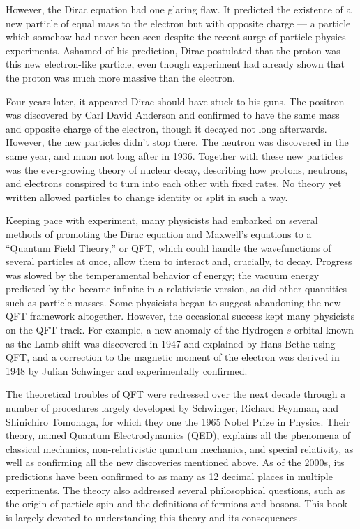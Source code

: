 However, the Dirac equation had one glaring flaw. It predicted the existence of a new particle of equal mass to the electron but with opposite charge --- a particle which somehow had never been seen despite the recent surge of particle physics experiments. Ashamed of his prediction, Dirac postulated that the proton was this new electron-like particle, even though experiment had already shown that the proton was much more massive than the electron.

Four years later, it appeared Dirac should have stuck to his guns. The positron was discovered by Carl David Anderson and confirmed to have the same mass and opposite charge of the electron, though it decayed not long afterwards. However, the new particles didn't stop there. The neutron was discovered in the same year, and muon not long after in 1936. Together with these new particles was the ever-growing theory of nuclear decay, describing how protons, neutrons, and electrons conspired to turn into each other with fixed rates. No theory yet written allowed particles to change identity or split in such a way. 

Keeping pace with experiment, many physicists had embarked on several methods of promoting the Dirac equation and Maxwell's equations to a ``Quantum Field Theory,'' or QFT, which could handle the wavefunctions of several particles at once, allow them to interact and, crucially, to decay. Progress was slowed by the temperamental behavior of energy; the vacuum energy predicted by the \Schrodinger became infinite in a relativistic version, as did other quantities such as particle masses. Some physicists began to suggest abandoning the new QFT framework altogether. However, the occasional success kept many physicists on the QFT track. For example, a new anomaly of the Hydrogen $s$ orbital known as the Lamb shift was discovered in 1947 and explained by Hans Bethe using QFT, and a correction to the magnetic moment of the electron was derived in 1948 by Julian Schwinger and experimentally confirmed.

The theoretical troubles of QFT were redressed over the next decade through a number of procedures largely developed by Schwinger, Richard Feynman, and Shinichiro Tomonaga, for which they one the 1965 Nobel Prize in Physics. Their theory, named Quantum Electrodynamics (QED), explains all the phenomena of classical mechanics, non-relativistic quantum mechanics, and special relativity, as well as confirming all the new discoveries mentioned above. As of the 2000s, its predictions have been confirmed to as many as 12 decimal places in multiple experiments. The theory also addressed several philosophical questions, such as the origin of particle spin and the definitions of fermions and bosons. This book is largely devoted to understanding this theory and its consequences.

